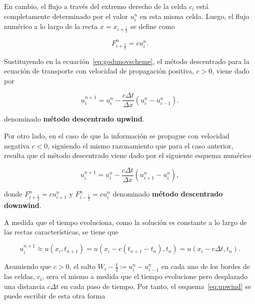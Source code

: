 En cambio, el flujo a través del extremo derecho de la celda $c_{i}$
está completamente determinado por el valor $u^{n}_{i}$ en esta misma celda.
Luego, el flujo numérico a lo largo de la recta $x=x_{i+\frac{1}{2}}$
se define como

\begin{equation*}
  F^{n}_{i+\frac{1}{2}}=
  cu^{n}_{i}.
\end{equation*}

Sustituyendo en la ecuación~\eqref{eq:godunovscheme}, el método
descentrado para la ecuación de transporte con velocidad de
propagación positiva, $c>0$, viene dado por

\begin{equation}\label{eq:upwind}
  u^{n+1}_{i}=
  u^{n}_{i}-
  \frac{c\Delta t}{\Delta x}
  \left(
  u^{n}_{i}-
  u^{n}_{i-1}
  \right).
\end{equation}

denominado \textbf{método descentrado upwind}.

Por otro lado, en el caso de que la información se propague con
velocidad negativa $c<0$, %
siguiendo el mismo razonamiento que para el caso anterior, resulta
que el método descentrado viene dado por el siguiente esquema
numérico

\begin{equation}\label{eq:downwind}
  u^{n+1}_{i}=
  u^{n}_{i}-
  \frac{c\Delta t}{\Delta x}
  \left(
  u^{n}_{i+1}-
  u^{n}_{i}
  \right),
\end{equation}

donde
\begin{math}
  F^{n}_{i+\frac{1}{2}}=
  cu^{n}_{i+1}
\end{math}
y
\begin{math}
  F^{n}_{i-\frac{1}{2}}=
  cu^{n}_{i}
\end{math}
denominado \textbf{método descentrado downwind}.

A medida que el tiempo evoluciona, como la solución es constante a lo
largo de las rectas características, se tiene que

\begin{equation*}
  u^{n+1}_{i}\approx
  u
  \left(x_{i},t_{n+1}\right)=
  u
  \left(
  x_{i}-
  c\left(t_{n+1}-t_{n}\right),
  t_{n}
  \right)=
  u
  \left(
  x_{i}-
  c\Delta t,t_{n}
  \right).
\end{equation*}

Asumiendo que $c>0$, el salto
\begin{math}
  W_{i}-\frac{1}{2}\coloneqq
  u^{n}_{i}-
  u_{i-1}^{n}
\end{math}
en cada uno de los bordes de las celdas, $c_{i}$, sera el mismo a
medida que el tiempo evolucione pero desplazado una distancia
$c\Delta t$ en cada paso de tiempo.
Por tanto, el esquema~\eqref{eq:upwind} se puede escribir de esta
otra forma

